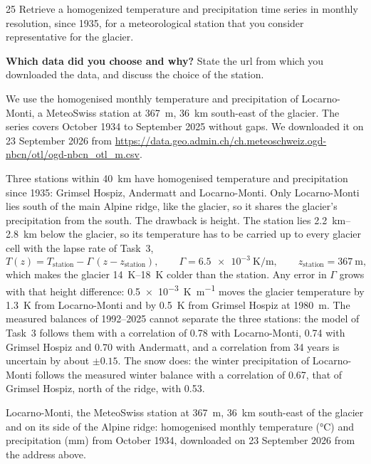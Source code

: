 \documentclass{scrartcl}
\renewcommand\unv[1]{#1}%
\begin{document}
\begin{reportpart}
\begin{question}{2}{5}\label{q:2}
Retrieve a homogenized temperature and precipitation time series in monthly resolution, since
1935, for a meteorological station that you consider representative for the glacier.

\textbf{Which data did you choose and why?} State the url from which you downloaded the data,
and discuss the choice of the station.
\end{question}

\unv{We use the homogenised monthly temperature and precipitation of Locarno\mbox{-}Monti, a
MeteoSwiss station at \qty{367}{\metre}, \qty{36}{\kilo\metre} south-east of the glacier. The
series covers October 1934 to September 2025 without gaps. We downloaded it on 23 September 2026
from \url{https://data.geo.admin.ch/ch.meteoschweiz.ogd-nbcn/otl/ogd-nbcn_otl_m.csv}.

Three stations within \qty{40}{\kilo\metre} have homogenised temperature and precipitation
since 1935: Grimsel Hospiz, Andermatt and Locarno\mbox{-}Monti. Only Locarno\mbox{-}Monti lies south of the
main Alpine ridge, like the glacier, so it shares the glacier's precipitation from the south.
The drawback is height. The station lies \qtyrange{2.2}{2.8}{\kilo\metre} below the glacier,
so its temperature has to be carried up to every glacier cell with the lapse rate of Task~3,
\[
  T(z) = T_\text{station} - \Gamma\,(z - z_\text{station}) ,
  \qquad \Gamma = \qty{6.5e-3}{\kelvin\per\metre} ,
  \qquad z_\text{station} = \qty{367}{\metre} ,
\]
which makes the glacier \qtyrange{14}{18}{\kelvin} colder than the station. Any error in
$\Gamma$ grows with that height difference: \qty{0.5e-3}{\kelvin\per\metre} moves the glacier
temperature by \qty{1.3}{\kelvin} from Locarno\mbox{-}Monti and by \qty{0.5}{\kelvin} from Grimsel
Hospiz at \qty{1980}{\metre}. The measured balances of 1992--2025 cannot separate the three
stations: the model of Task~3 follows them with a correlation of 0.78 with Locarno\mbox{-}Monti,
0.74 with Grimsel Hospiz and 0.70 with Andermatt, and a correlation from 34 years is uncertain
by about $\pm 0.15$. The snow does: the winter precipitation of Locarno\mbox{-}Monti follows the
measured winter balance with a correlation of 0.67, that of Grimsel Hospiz, north of the ridge,
with 0.53.

\begin{converted}
Locarno\mbox{-}Monti, the MeteoSwiss station at \qty{367}{\metre}, \qty{36}{\kilo\metre}
south-east of the glacier and on its side of the Alpine ridge: homogenised monthly temperature
(\unit{\degreeCelsius}) and precipitation (\unit{\milli\metre}) from October 1934, downloaded on
23 September 2026 from the address above.
\end{converted}}


\end{reportpart}
\end{document}
